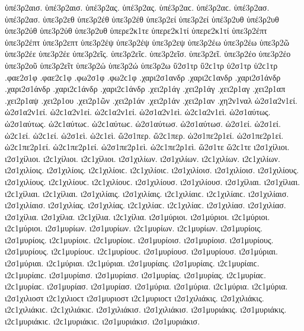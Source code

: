 {ὑπέ3ρ2αισ. ὑπέ3ρ2αισ.
ὑπέ3ρ2ας. ὑπέ3ρ2ας. ὑπέ3ρ2αϲ. ὑπέ3ρ2αϲ.
ὑπέ3ρ2ασ. ὑπέ3ρ2ασ.
ὑπε3ρ2εθ   %
ὑπε3ρ2έθ ὑπε3ρ2έθ
ὑπε3ρ2εί ὑπε3ρ2εί   %
ὑπέ3ρ2υθ ὑπέ3ρ2υθ   %
ὑπε3ρ2ύθ ὑπε3ρ2ύθ
ὑπε3ρ2υθ   %
ὑπερε2κ1τε   %
ὑπερε2κ1τί ὑπερε2κ1τί   %
ὑπε3ρ2έπτ ὑπε3ρ2έπτ   %
ὑπε3ρ2επτ
ὑπε3ρ2έψ ὑπε3ρ2έψ
ὑπε3ρ2εψ
ὑπε3ρ2έω ὑπε3ρ2έω   %
ὑπε3ρ2ῶ
ὑπε3ρ2έε ὑπε3ρ2έε
ὑπε3ρ2εῖς. ὑπε3ρ2εῖϲ.
ὑπε3ρ2εῖσ.
ὑπε3ρ2εῖ.
ὑπε3ρ2έο ὑπε3ρ2έο
ὑπε3ρ2οῦ
ὑπε3ρ2εῖτ
ὑπε3ρ2ώ ὑπε3ρ2ώ   %
ὑπε3ρ2ω   %
ὕ2σ1τρ ὕ2ϲ1τρ   %
ὑ2σ1τρ ὑ2ϲ1τρ   %
.φαε2σ1φ .φαε2ϲ1φ   %
.φω2σ1φ .φω2ϲ1φ   %
.χαρι2σ1ανδρ .χαρι2ϲ1ανδρ   %
.χαρι2σ1άνδρ .χαρι2σ1άνδρ .χαρι2ϲ1άνδρ .χαρι2ϲ1άνδρ
.χει2ρ1άγ .χει2ρ1άγ   %
.χει2ρ1αγ   %
.χει2ρ1απ   %
.χει2ρ1αψ   %
.χει2ρ1ου   %
.χει2ρ1ῶν   %
.χει2ρ1άν .χει2ρ1άν
.χει2ρ1αν
.χη2ν1ναλ   %
ὡ2σ1α2ν1εί. ὡ2σ1α2ν1εί. ὡ2ϲ1α2ν1εί. ὡ2ϲ1α2ν1εί.   %
ὡ2σ1α2ν1εὶ. ὡ2ϲ1α2ν1εὶ.
ὡ2σ1αύτως. ὡ2σ1αύτως. ὡ2ϲ1αύτωϲ. ὡ2ϲ1αύτωϲ.   %
ὡ2σ1αύτωσ. ὡ2σ1αύτωσ.
ὡ2σ1εί. ὡ2σ1εί. ὡ2ϲ1εί. ὡ2ϲ1εί.   %
ὡ2σ1εὶ. ὡ2ϲ1εὶ.
ὥ2σ1περ. ὥ2ϲ1περ.   %
ὡ2σ1πε2ρ1εί. ὡ2σ1πε2ρ1εί. ὡ2ϲ1πε2ρ1εί. ὡ2ϲ1πε2ρ1εί.   %
ὡ2σ1πε2ρ1εὶ. ὡ2ϲ1πε2ρ1εὶ.
ὥ2σ1τε ὥ2ϲ1τε   %
ι2σ1χίλιοι. ι2σ1χίλιοι. ι2ϲ1χίλιοι. ι2ϲ1χίλιοι.   %
ι2σ1χιλίων. ι2σ1χιλίων. ι2ϲ1χιλίων. ι2ϲ1χιλίων.
ι2σ1χιλίοις. ι2σ1χιλίοις. ι2ϲ1χιλίοιϲ. ι2ϲ1χιλίοιϲ.
ι2σ1χιλίοισ. ι2σ1χιλίοισ.
ι2σ1χιλίους. ι2σ1χιλίους. ι2ϲ1χιλίουϲ. ι2ϲ1χιλίουϲ.
ι2σ1χιλίουσ. ι2σ1χιλίουσ.
ι2σ1χίλιαι. ι2σ1χίλιαι. ι2ϲ1χίλιαι. ι2ϲ1χίλιαι.
ι2σ1χιλίαις. ι2σ1χιλίαις. ι2ϲ1χιλίαιϲ. ι2ϲ1χιλίαιϲ.
ι2σ1χιλίαισ. ι2σ1χιλίαισ.
ι2σ1χιλίας. ι2σ1χιλίας. ι2ϲ1χιλίαϲ. ι2ϲ1χιλίαϲ.
ι2σ1χιλίασ. ι2σ1χιλίασ.
ι2σ1χίλια. ι2σ1χίλια. ι2ϲ1χίλια. ι2ϲ1χίλια.
%
ι2σ1μύριοι. ι2σ1μύριοι. ι2ϲ1μύριοι. ι2ϲ1μύριοι.   %
ι2σ1μυρίων. ι2σ1μυρίων. ι2ϲ1μυρίων. ι2ϲ1μυρίων.
ι2σ1μυρίοις. ι2σ1μυρίοις. ι2ϲ1μυρίοιϲ. ι2ϲ1μυρίοιϲ.
ι2σ1μυρίοισ. ι2σ1μυρίοισ.
ι2σ1μυρίους. ι2σ1μυρίους. ι2ϲ1μυρίουϲ. ι2ϲ1μυρίουϲ.
ι2σ1μυρίουσ. ι2σ1μυρίουσ.
ι2σ1μύριαι. ι2σ1μύριαι. ι2ϲ1μύριαι. ι2ϲ1μύριαι.
ι2σ1μυρίαις. ι2σ1μυρίαις. ι2ϲ1μυρίαιϲ. ι2ϲ1μυρίαιϲ.
ι2σ1μυρίαισ. ι2σ1μυρίαισ.
ι2σ1μυρίας. ι2σ1μυρίας. ι2ϲ1μυρίαϲ. ι2ϲ1μυρίαϲ.
ι2σ1μυρίασ. ι2σ1μυρίασ.
ι2σ1μύρια. ι2σ1μύρια. ι2ϲ1μύρια. ι2ϲ1μύρια.
%
ι2σ1χιλιοστ ι2ϲ1χιλιοϲτ   %
%
ι2σ1μυριοστ ι2ϲ1μυριοϲτ   %
%
ι2σ1χιλιάκις. ι2σ1χιλιάκις. ι2ϲ1χιλιάκιϲ. ι2ϲ1χιλιάκιϲ.   %
ι2σ1χιλιάκισ. ι2σ1χιλιάκισ.
%
ι2σ1μυριάκις. ι2σ1μυριάκις. ι2ϲ1μυριάκιϲ. ι2ϲ1μυριάκιϲ.   %
ι2σ1μυριάκισ. ι2σ1μυριάκισ.
}

